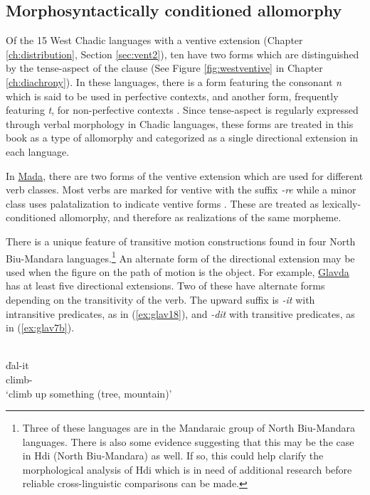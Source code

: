 \subsection{Morphosyntactically conditioned allomorphy} \label{sec:allomorphy}

Of the 15 West Chadic languages with a ventive extension (Chapter \ref{ch:distribution}, Section \ref{sec:vent2}), ten have two forms which are distinguished by the tense-aspect of the clause (See Figure \ref{fig:westventive} in Chapter \ref{ch:diachrony}). In these languages, there is a form featuring the consonant \textit{n} which is said to be used in perfective contexts, and another form, frequently featuring \textit{t}, for non-perfective contexts \citep[307--309]{schuhChadicCornucopia2017}. Since tense-aspect is regularly expressed through verbal morphology in Chadic languages, these forms are treated in this book as a type of allomorphy and categorized as a single directional extension in each language. 

In \hyperref[mada]{Mada}, there are two forms of the ventive extension which are used for different verb classes. Most verbs are marked for ventive with the suffix \textit{-re} while a minor class uses palatalization to indicate ventive forms \citep{ernstkurdiTenseAspectMood2016}. These are treated as lexically-conditioned allomorphy, and therefore as realizations of the same morpheme.

There is a unique feature of transitive motion constructions found in four North Biu-Mandara languages.\footnote{Three of these languages are in the Mandaraic group of North Biu-Mandara languages. There is also some evidence suggesting that this may be the case in Hdi (North Biu-Mandara) as well. If so, this could help clarify the morphological analysis of Hdi which is in need of additional research before reliable cross-linguistic comparisons can be made.} An alternate form of the directional extension may be used when the figure on the path of motion is the object. For example, \hyperref[glav]{Glavda} has at least five directional extensions. Two of these have alternate forms depending on the transitivity of the verb. The upward suffix is \textit{-it} with intransitive predicates, as in (\ref{ex:glav18}), and \textit{-dit} with transitive predicates, as in (\ref{ex:glav7b}). 

\ea\label{ex:glav18}
 \\
\gll ďal-it	\\
climb-		\\
\glt `climb up something (tree, mountain)'

